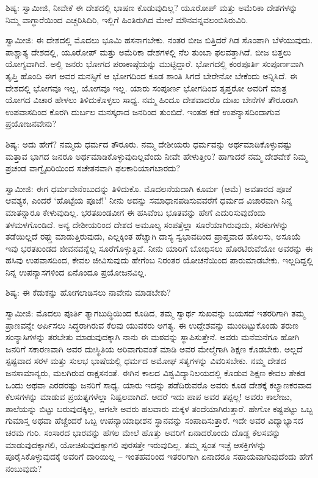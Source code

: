 ಶಿಷ್ಯ: ಸ್ವಾಮೀಜಿ, ನೀವೇಕೆ ಈ ದೇಶದಲ್ಲಿ ಭಾಷಣ ಕೊಡುವುದಿಲ್ಲ? ಯೂರೋಪ್ ಮತ್ತು ಅಮೆರಿಕಾ ದೇಶಗಳನ್ನು ನಿಮ್ಮ ವಾಗ್ಧಾರೆಯಿಂದ ಎಚ್ಚರಿಸಿದಿರಿ, ಇಲ್ಲಿಗೆ ಹಿಂತಿರುಗಿದ ಮೇಲೆ ಮೌನವನ್ನವಲಂಬಿಸಿರುವಿರಿ.

ಸ್ವಾಮೀಜಿ: ಈ ದೇಶದಲ್ಲಿ ಮೊದಲು ಭೂಮಿ ಹಸನಾಗಬೇಕು. ನಂತರ ಬೀಜ ಬಿತ್ತಿದರೆ ಗಿಡ ಸೊಂಪಾಗಿ ಬೆಳೆಯುವುದು. ಪಾಶ್ಚಾತ್ಯ ದೇಶದಲ್ಲಿ, ಯೂರೋಪ್ ಮತ್ತು ಅಮೆರಿಕಾ ದೇಶಗಳಲ್ಲಿ ನೆಲ ತುಂಬಾ ಫಲವತ್ತಾಗಿದೆ. ಬೀಜ ಬಿತ್ತಲು ಯೋಗ್ಯವಾಗಿದೆ. ಅಲ್ಲಿ ಜನರು ಭೋಗದ ಪರಾಕಾಷ್ಠೆಯನ್ನು ಮುಟ್ಟಿದ್ದಾರೆ. ಭೋಗದಲ್ಲಿ ಕಂಠಪೂರ್ತಿ ಸಂಪೂರ್ಣವಾಗಿ ತೃಪ್ತಿ ಹೊಂದಿ ಈಗ ಅವರ ಮನಸ್ಸಿಗೆ ಆ ಭೋಗದಿಂದ ಕೂಡ ಶಾಂತಿ ಸಿಗದೆ ಬೇರೇನೋ ಬೇಕೆಂದು ಅನ್ನಿಸಿದೆ. ಈ ದೇಶದಲ್ಲಿ ಭೋಗವೂ ಇಲ್ಲ, ಯೋಗವೂ ಇಲ್ಲ. ಯಾರು ಸಂಪೂರ್ಣ ಭೋಗದಿಂದ ತೃಪ್ತರೋ ಅವರಿಗೆ ಮಾತ್ರ ಯೋಗದ ವಿಚಾರ ಹೇಳಲು ತಿಳಿದುಕೊಳ್ಳಲು ಸಾಧ್ಯ. ನಮ್ಮ ಹಿಂದೂ ದೇಶವಾದರೊ ದುಃಖ ಬೇನೆಗಳ ತೌರೂರಾಗಿ ಉಪವಾಸದಿಂದ ಕೊರಗಿ ದುರ್ಬಲ ಮನಸ್ಕರಾದ ಜನರಿಂದ ತುಂಬಿದೆ. ಇಂತಹ ಕಡೆ ಉಪನ್ಯಾಸದಿಂದಾಗುವ ಪ್ರಯೋಜನವೇನು?

ಶಿಷ್ಯ: ಅದು ಹೇಗೆ? ನಮ್ಮದು ಧರ್ಮದ ತೌರೂರು. ನಮ್ಮ ದೇಶೀಯರು ಧರ್ಮವನ್ನು ಅರ್ಥಮಾಡಿಕೊಳ್ಳುವಷ್ಟು ಮತ್ತಾವ ಭಾಗದ ಜನರೂ ಅರ್ಥಮಾಡಿಕೊಳ್ಳುವುದಿಲ್ಲವೆಂದು ನೀವೇ ಹೇಳುತ್ತೀರಿ? ಹಾಗಾದರೆ ನಮ್ಮ ದೇಶವೇಕೆ ನಿಮ್ಮ ಪ್ರಚಂಡ ವಾಗ್ವೈಖರಿಯಿಂದ ಸಚೇತನವಾಗಿ ಫಲಕಾರಿಯಾಗಬಾರದು?

ಸ್ವಾಮೀಜಿ: ಈಗ ಧರ್ಮವೇನೆಂಬುದನ್ನು ತಿಳಿದುಕೊ. ಮೊದಲನೆಯದಾಗಿ ಕೂರ್ಮ (ಆಮೆ) ಅವತಾರದ ಪೂಜೆ ಆವಶ್ಯಕ, ಎಂದರೆ ‘ಹೊಟ್ಟೆಯ ಪೂಜೆ!’ ನೀನು ಅದನ್ನು ಸಮಾಧಾನಪಡಿಸುವವರೆಗೆ ಧರ್ಮದ ವಿಚಾರವಾಗಿ ನಿನ್ನ ಮಾತನ್ನಾರೂ ಕೇಳುವುದಿಲ್ಲ. ಭರತಖಂಡವೀಗ ಈ ಹಸಿವೆಂಬ ಭೂತವನ್ನು ಹೇಗೆ ಎದುರಿಸುವುದೆಂದು ತಳಮಳಗೊಂಡಿದೆ. ಅನ್ಯ ದೇಶೀಯರಿಂದ ದೇಶದ ಅಮೂಲ್ಯ ಸಂಪತ್ತೆಲ್ಲಾ ಸೂರೆಯಾಗಿರುವುದು, ಸರಕುಗಳನ್ನು ತಡೆಯಿಲ್ಲದೆ ರಫ್ತು ಮಾಡುತ್ತಿರುವುದು, ಎಲ್ಲಕ್ಕಿಂತ ಹೆಚ್ಚಾಗಿ ದಾಸ್ಯ ಸ್ವಭಾವದಿಂದ ಪ್ರಾಪ್ತವಾದ ಹೊಲಸು, ಅಸೂಯೆ ಇವು ಭರತಖಂಡದ ಜೀವನವನ್ನೆಲ್ಲ ಸೂರೆಗೊಳ್ಳುತ್ತಿವೆ. ನೀನು ಯಾರಿಗೆ ಬೋಧಿಸಲು ಹೊರಟಿರುವೆಯೋ ಅವರನ್ನು ಈ ಹಸಿವು ಉಪವಾಸದಿಂದ, ಕೇವಲ ಜೀವಿಸುವುದು ಹೇಗೆಂಬ ನಿರಂತರ ಯೋಚನೆಯಿಂದ ಪಾರುಮಾಡಬೇಕು. ಇಲ್ಲದಿದ್ದಲ್ಲಿ ನಿನ್ನ ಉಪನ್ಯಾಸಗಳಿಂದ ಏನೊಂದೂ ಪ್ರಯೋಜನವಿಲ್ಲ.

ಶಿಷ್ಯ: ಈ ಕೆಡುಕನ್ನು ಹೋಗಲಾಡಿಸಲು ನಾವೇನು ಮಾಡಬೇಕು?

ಸ್ವಾಮೀಜಿ: ಮೊದಲು ಪೂರ್ತಿ ತ್ಯಾಗಬುದ್ಧಿಯಿಂದ ಕೂಡಿದ, ತಮ್ಮ ಸ್ವಾರ್ಥ ಸುಖವನ್ನು ಬಯಸದೆ ಇತರರಿಗಾಗಿ ತಮ್ಮ ಪ್ರಾಣವನ್ನೇ ಅರ್ಪಿಸಲು ಸಿದ್ಧರಾಗಿರುವ ಕೆಲವು ಯುವಕರು ಅಗತ್ಯ. ಈ ಉದ್ದೇಶವನ್ನು ಮುಂದಿಟ್ಟುಕೊಂಡು ತರುಣ ಸಂನ್ಯಾಸಿಗಳನ್ನು ತರಬೇತು ಮಾಡುವುದಕ್ಕಾಗಿ ನಾನು ಈ ಮಠವನ್ನು ಸ್ಥಾಪಿಸುತ್ತೇನೆ. ಅವರು ಮನೆಮನೆಗೂ ಹೋಗಿ ಜನರಿಗೆ ಸಕಾರಣವಾಗಿ ಅವರ ದುಃಸ್ಥಿತಿಯ ಅರಿವಾಗುವಂತೆ ಮಾಡಿ ಅವರ ಮೇಲ್ಮೆಗಾಗಿ ಶಿಕ್ಷಣ ಕೊಡಬೇಕು. ಅಲ್ಲದೆ ಸ್ಪಷ್ಟವಾದ ಸರಳ ಮತ್ತು ಸುಲಭ ಭಾಷೆಯಲ್ಲಿ ಧರ್ಮದ ಅಮೋಘ ಸತ್ಯಗಳನ್ನು ವಿವರಿಸಬೇಕು. ನಮ್ಮ ದೇಶದ ಜನಸಾಮಾನ್ಯರು, ಮಲಗಿರುವ ರಾಕ್ಷಸನಂತೆ. ಈಗಿನ ಕಾಲದ ವಿಶ್ವವಿದ್ಯಾನಿಲಯದಲ್ಲಿ ಕೊಡುವ ಶಿಕ್ಷಣ ಕೇವಲ ಶೇಕಡ ಒಂದು ಅಥವಾ ಎರಡರಷ್ಟು ಜನರಿಗೆ ಸಾಧ್ಯ. ಯಾರು ಇದನ್ನು ಪಡೆದಿರುವರೊ ಅವರು ಕೂಡ ದೇಶಕ್ಕೆ ಕಲ್ಯಾಣಕರವಾದ ಕೆಲಸಗಳನ್ನು ಮಾಡುವ ಪ್ರಯತ್ನಗಳೆಲ್ಲಾ ನಿಷ್ಪಲವಾಗಿದೆ. ಆದರೆ ಇದು ಪಾಪ ಅವರ ತಪ್ಪಲ್ಲ! ಅವರು ಕಾಲೇಜು, ಶಾಲೆಯನ್ನು ಬಿಟ್ಟು ಬರುವುದಕ್ಕಿಲ್ಲ, ಆಗಲೇ ಅವರು ಹಲವಾರು ಮಕ್ಕಳ ತಂದೆಯಾಗಿರುತ್ತಾರೆ. ಹೇಗೋ ಕಷ್ಟಪಟ್ಟು ಒಬ್ಬ ಗುಮಾಸ್ತ ಅಥವಾ ಹೆಚ್ಚೆಂದರೆ ಒಬ್ಬ ಉಪನ್ಯಾಯಾಧೀಶನ ಸ್ಥಾನವನ್ನು ಸಂಪಾದಿಸುತ್ತಾರೆ. ಇದೇ ಅವರ ವಿದ್ಯಾಭ್ಯಾಸದ ಚರಮ ಗುರಿ. ಸಂಸಾರದ ಭಾರವನ್ನು ಹೆಗಲ ಮೇಲೆ ಹೊತ್ತು ಅವರಿಗೆ ಏನಾದರೊಂದು ದೊಡ್ಡ ಕೆಲಸವನ್ನು ಮಾಡುವುದಕ್ಕಾಗಲಿ, ಯೋಚಿಸುವುದಕ್ಕಾಗಲಿ ಪುರಸತ್ತೇ ಇರುವುದಿಲ್ಲ. ತಮ್ಮ ಸ್ವಂತ ಇಚ್ಛೆ ಆಸಕ್ತಿಗಳನ್ನು ಪೂರೈಸಿಕೊಳ್ಳುವುದಕ್ಕೆ ಅವರಿಗೆ ದಾರಿಯಿಲ್ಲ – ಇಂತಹವರಿಂದ ಇತರರಿಗಾಗಿ ಏನಾದರೂ ಸಹಾಯವಾಗುವುದೆಂದು ಹೇಗೆ ನಂಬುವುದು?

